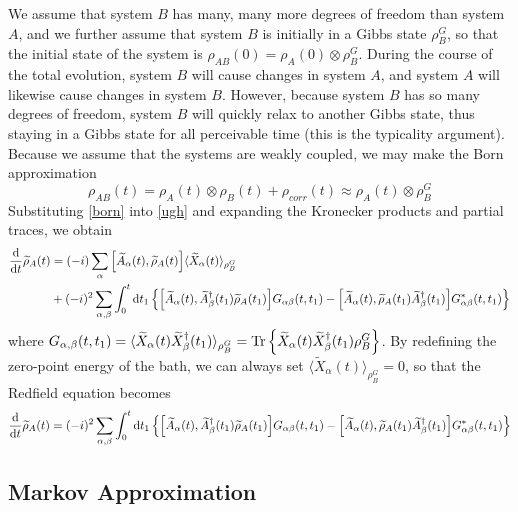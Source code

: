 \documentclass{article}
\newcommand{\ten}{\otimes}
\newcommand{\Tra}[1]{\Tr\left\{#1\right\}}
\newcommand{\til}[1]{\widetilde{#1}}
\newcommand{\ave}[2]{\langle #1\rangle_{#2}}
\begin{document}
We assume that system $B$ has many, many more degrees of freedom than system $A$, and we further assume that system $B$ is initially in a Gibbs state $\rho_B^G$, so that the initial state of the system is $\rho_{AB}(0) = \rho_A(0)\ten\rho_B^G$. During the course of the total evolution, system $B$ will cause changes in system $A$, and system $A$ will likewise cause changes in system $B$. However, because system $B$ has so many degrees of freedom, system $B$ will quickly relax to another Gibbs state, thus staying in a Gibbs state for all perceivable time (this is the typicality argument). Because we assume that the systems are weakly coupled, we may make the Born approximation
\begin{equation}\label{born}
\rho_{AB}(t) = \rho_A(t)\ten\rho_B(t) + \rho_{corr}(t)\approx \rho_A(t)\ten\rho_B^G
\end{equation}
Substituting \ref{born} into \ref{ugh} and expanding the Kronecker products and partial traces, we obtain
\begin{align}\label{fuckmyass}
\begin{split}
\dv{t}\til{\rho}_A(t) &= (-i)\sum_{\alpha}\comm{\til{A}_{\alpha}(t)}{\til{\rho}_A(t)}\ave{\til{X}_{\alpha}(t)}{\rho_B^G}\\
&+ (-i)^2\sum_{\alpha,\beta}\int_0^t\dd{t_1}\left\{\comm{\til{A}_{\alpha}(t)}{\til{A}_{\beta}^{\dag}(t_1)\til{\rho}_A(t_1)}G_{\alpha\beta}(t,t_1)-\comm{\til{A}_{\alpha}(t)}{\til{\rho}_A(t_1)\til{A}_{\beta}^{\dag}(t_1)}G_{\alpha\beta}^*(t,t_1)\right\}
\end{split}
\end{align}
where $G_{\alpha,\beta}(t,t_1) =\ave{\til{X}_{\alpha}(t)\til{X}_{\beta}^{\dag}(t_1)}{\rho_B^G}= \Tra{\til{X}_{\alpha}(t)\til{X}_{\beta}^{\dag}(t_1)\rho_B^G}$. By redefining the zero-point energy of the bath, we can always set $\ave{\til{X}_{\alpha}(t)}{\rho_B^G} = 0$, so that the Redfield equation becomes
\begin{align}\label{redfield}
\dv{t}\til{\rho}_A(t) = (-i)^2\sum_{\alpha,\beta}\int_0^t\dd{t_1}\left\{\comm{\til{A}_{\alpha}(t)}{\til{A}_{\beta}^{\dag}(t_1)\til{\rho}_A(t_1)}G_{\alpha\beta}(t,t_1)-\comm{\til{A}_{\alpha}(t)}{\til{\rho}_A(t_1)\til{A}_{\beta}^{\dag}(t_1)}G_{\alpha\beta}^*(t,t_1)\right\}
\end{align}

\subsection{Markov Approximation}
\end{document}
